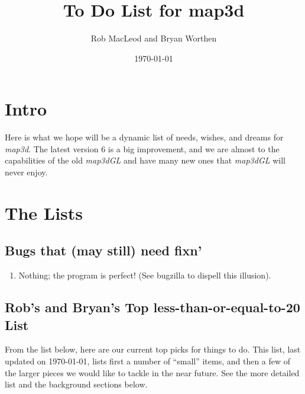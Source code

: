 \documentclass[11pt]{article}
\newcommand{\map}{\emph{map3d}}
\newcommand{\mapgl}{\emph{map3dGL}}
\begin{document}
  \newcommand{\surfcompare}%
  {\centerline{\epsfig{file=figures/map3d-comp1.ps,width=\columnwidth}}}
\begin{htmlonly}
  \newcommand{\surfcompare}{%
  \htmladdimg[align=top,width=1053,alt="compare color mapping"]
  {figures/map3d-comp1.gif}}
\end{htmlonly}
\newcommand{\X}[1]{#1\index{#1}}
\thispagestyle{empty}
\title{To Do List for map3d}
\author{Rob MacLeod and Bryan Worthen}
\date{\today}
\maketitle

\tableofcontents
\newpage

\section{Intro}

Here is what we hope will be a dynamic list of needs, wishes, and dreams for
\map{}.  The latest version 6 is a big improvement, and we are almost 
to the capabilities of the old \mapgl{} and have many new ones that
\mapgl{} will never enjoy.

\section{The Lists}

\subsection{Bugs that (may still) need fixn'}

\begin{enumerate}
  \item Nothing; the program is perfect!  (See bugzilla to dispell this
  illusion).
\end{enumerate}


\subsection{Rob's and Bryan's Top less-than-or-equal-to-20 List}

From the list below, here are our current top picks for things to do.  This
list, last updated on \today{}, lists first a number of ``small''
items, and then a few of the larger pieces we would like to tackle in the
near future.  See the more detailed list and the background sections below.
\end{document}
